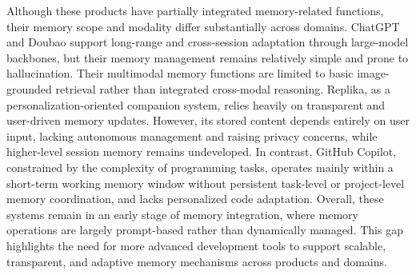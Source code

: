 \documentclass[manuscript,screen]{acmart}
\begin{document}
Although these products have partially integrated memory-related functions, their memory scope and modality differ substantially across domains. ChatGPT and Doubao support long-range and cross-session adaptation through large-model backbones, but their memory management remains relatively simple and prone to hallucination. Their multimodal memory functions are limited to basic image-grounded retrieval rather than integrated cross-modal reasoning. Replika, as a personalization-oriented companion system, relies heavily on transparent and user-driven memory updates. However, its stored content depends entirely on user input, lacking autonomous management and raising privacy concerns, while higher-level session memory remains undeveloped. In contrast, GitHub Copilot, constrained by the complexity of programming tasks, operates mainly within a short-term working memory window without persistent task-level or project-level memory coordination, and lacks personalized code adaptation. Overall, these systems remain in an early stage of memory integration, where memory operations are largely prompt-based rather than dynamically managed. This gap highlights the need for more advanced development tools to support scalable, transparent, and adaptive memory mechanisms across products and domains.
\end{document}
